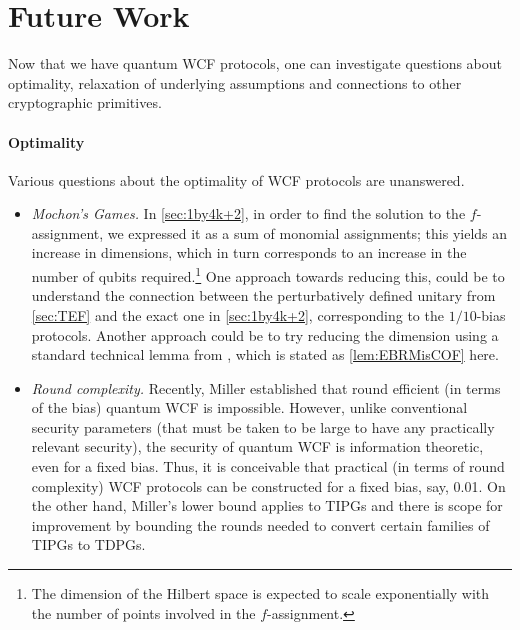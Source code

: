 \documentclass{theoretics}
\begin{document}
%
%
%
\section{Future Work \label{sec:conclusions}}

%
%
%
%
%
%
%
%
%
%
%
%
%
%
%
%
%
%

%
%
%
%
%
%

%
Now that we have quantum WCF protocols, one can investigate questions about optimality, relaxation of underlying assumptions and connections to other cryptographic primitives.

\paragraph{Optimality} Various questions about the optimality of WCF protocols are unanswered.
\begin{itemize}
  \item \emph{Mochon's Games.} In \cref{sec:1by4k+2},  in order to find the solution to the $f$-assignment, we
        expressed it as a sum of monomial assignments; this yields an increase
        in dimensions, which in turn corresponds to an increase in the number
        of qubits required.\footnote{The dimension of the Hilbert space is expected to scale exponentially with the
          number of points involved in the $f$-assignment.}  One approach
        towards reducing this, could be to understand the connection between
        the perturbatively defined unitary from \cref{sec:TEF} and
        the exact one in \cref{sec:1by4k+2}, corresponding to the $1/10$-bias
        protocols. Another approach could be to try reducing the dimension
        using a standard technical lemma from \cite{Mochon07}, which is stated
        as \cref{lem:EBRMisCOF} here.
  \item \emph{Round complexity.} Recently, Miller \cite{Miller2019} established that round efficient (in terms of the bias) quantum WCF is impossible. However, unlike conventional security parameters (that must be taken to be large to have any practically relevant security), the security of quantum WCF is information theoretic, even for a fixed bias. Thus, it is conceivable that practical (in terms of round complexity) WCF protocols can be constructed for a fixed bias, say, 0.01. On the other hand, Miller's lower bound applies to TIPGs and there is scope for improvement by bounding the rounds needed to convert certain families of TIPGs to TDPGs.

\end{itemize}
\end{document}
